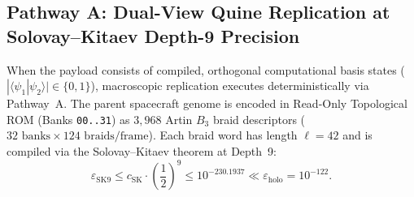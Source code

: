 \documentclass[11pt,onecolumn]{article}
\begin{document}
\FloatBarrier
\subsection{Pathway A: Dual-View Quine Replication at Solovay--Kitaev Depth-9 Precision}
When the payload consists of compiled, orthogonal computational basis states ($|\langle\psi_1|\psi_2\rangle| \in \{0, 1\}$), macroscopic replication executes deterministically via Pathway~A. The parent spacecraft genome is encoded in Read-Only Topological ROM (Banks \texttt{00..31}) as $3{,}968$ Artin $B_3$ braid descriptors ($32\text{ banks} \times 124\text{ braids/frame}$). Each braid word has length $\ell = 42$ and is compiled via the Solovay--Kitaev theorem at Depth~9:
\begin{equation}
\varepsilon_{\text{SK9}} \le c_{\text{SK}} \cdot \left(\frac{1}{2}\right)^{9} \le 10^{-230.1937} \ll \varepsilon_{\text{holo}} = 10^{-122}.
\label{eq:sk9_precision}
\end{equation}
\end{document}
